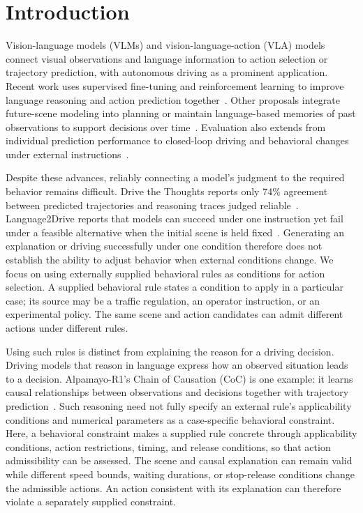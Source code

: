 \section{Introduction}\label{sec:introduction}

Vision-language models (VLMs) and vision-language-action (VLA) models connect
visual observations and language information to action selection or trajectory
prediction, with autonomous driving as a prominent application. Recent work uses supervised fine-tuning and
reinforcement learning to improve language reasoning and action prediction
together~\cite{r1}. Other proposals integrate future-scene modeling into planning
or maintain language-based memories of past observations to support decisions
over time~\cite{Wang2026DriveWLA,Yan2026ADMemo}. Evaluation also extends from
individual prediction performance to closed-loop driving and behavioral changes
under external instructions~\cite{Jia2026Bench2DriveVL,You2026Language2Drive}.

Despite these advances, reliably connecting a model's judgment to the required
behavior remains difficult. Drive the Thoughts reports only 74\% agreement
between predicted trajectories and reasoning traces judged reliable~\cite{r18}.
Language2Drive reports that models can succeed under one instruction yet fail
under a feasible alternative when the initial scene is held
fixed~\cite{You2026Language2Drive}. Generating an explanation or driving
successfully under one condition therefore does not establish the ability to
adjust behavior when external conditions change. We focus on using externally
supplied behavioral rules as conditions for action selection. A supplied
behavioral rule states a condition to apply in a particular case; its source
may be a traffic regulation, an operator instruction, or an experimental
policy. The same scene and action candidates can admit different actions
under different rules.

Using such rules is distinct from explaining the reason for a driving
decision. Driving models that reason in language express how an observed
situation leads to a decision. Alpamayo-R1's Chain of Causation (CoC) is one
example: it learns causal relationships between observations and decisions
together with trajectory prediction~\cite{r1}. Such reasoning need not fully
specify an external rule's applicability conditions and numerical parameters
as a case-specific behavioral constraint. Here, a behavioral constraint makes
a supplied rule concrete through applicability conditions, action restrictions,
timing, and release conditions, so that action admissibility can be assessed.
The scene and causal explanation can remain valid while different speed
bounds, waiting durations, or stop-release conditions change the admissible
actions. An action consistent with its explanation can therefore violate a
separately supplied constraint.

